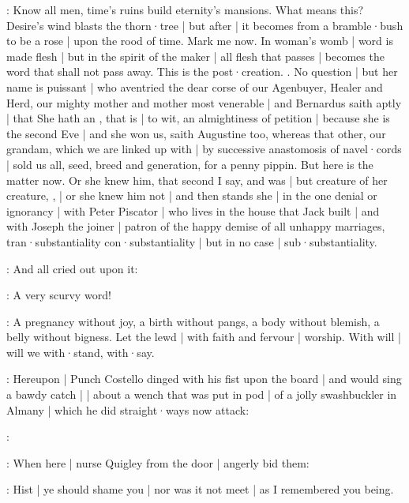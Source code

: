 \stephen:
Know all men,
time's ruins build eternity's mansions.
What means this?
Desire's wind blasts the thorn·tree |
but after |
it becomes from a bramble·bush to be a rose |
upon the rood of time.
Mark me now.
In woman's womb |
word is made flesh |
but in the spirit of the maker |
all flesh that passes |
becomes the word that shall not pass away.
This is the post·creation.
.
No question |
but her name is puissant |
who aventried the dear corse of our Agenbuyer,
Healer and Herd,
our mighty mother and mother most venerable |
and Bernardus saith aptly |
that She hath an ,
that is |
to wit,
an almightiness of petition |
because she is the second Eve |
and she won us,
saith Augustine too,
whereas that other,
our grandam,
which we are linked up with |
by successive anastomosis
of navel·cords |
sold us all,
seed,
breed and generation,
for a penny pippin.
But here is the matter now.
Or she knew him,
that second I say,
and was |
but creature of her creature,
, |
or she knew him not |
and then stands she |
in the one denial or ignorancy |
with Peter Piscator |
who lives in the house that Jack built |
and with Joseph the joiner |
patron of the happy demise of all unhappy marriages,
 tran·substantiality  con·substantiality |
but in no case |
sub·substantiality.

:
And all cried out upon it:

\All:
A very scurvy word!

\stephen:
A pregnancy without joy,
a birth without pangs,
a body without blemish,
a belly without bigness.
Let the lewd |
with faith and fervour |
worship.
With will |
will we with·stand,
with·say.


:
Hereupon |
Punch Costello dinged with his fist upon the board |
and would sing a bawdy catch |
 |
about a wench that was put in pod |
of a jolly swashbuckler in Almany |
which he did straight·ways now attack:

\punch:

:
When here |
nurse Quigley from the door |
angerly bid them:

\nursequigley:
Hist |
ye should shame you |
nor was it not meet |
as I remembered you being.

